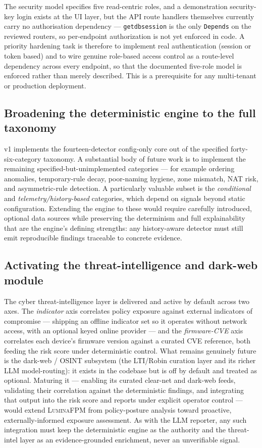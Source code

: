 \documentclass[12pt,a4paper]{report}
\renewcommand{\_}{\textunderscore\allowbreak}
\begin{document}
The security model specifies five read-centric roles, and a demonstration security-key login exists at the UI layer, but the API route handlers themselves currently carry no authorisation dependency --- \texttt{get\_db\_session} is the only \texttt{Depends} on the reviewed routers, so per-endpoint authorization is not yet enforced in code. A priority hardening task is therefore to implement real authentication (session or token based) and to wire genuine role-based access control as a route-level dependency across every endpoint, so that the documented five-role model is enforced rather than merely described. This is a prerequisite for any multi-tenant or production deployment.

\subsection{Broadening the deterministic engine to the full taxonomy}
\label{sec:ch5-taxonomy}

v1 implements the fourteen-detector config-only core out of the specified forty-six-category taxonomy. A substantial body of future work is to implement the remaining specified-but-unimplemented categories --- for example ordering anomalies, temporary-rule decay, poor-naming hygiene, zone mismatch, NAT risk, and asymmetric-rule detection. A particularly valuable subset is the \emph{conditional} and \emph{telemetry/history-based} categories, which depend on signals beyond static configuration. Extending the engine to these would require carefully introduced, optional data sources while preserving the determinism and full explainability that are the engine's defining strengths: any history-aware detector must still emit reproducible findings traceable to concrete evidence.

\subsection{Activating the threat-intelligence and dark-web module}
\label{sec:ch5-lti}

The cyber threat-intelligence layer is delivered and active by default across two axes. The \emph{indicator} axis correlates policy exposure against external indicators of compromise --- shipping an offline indicator set so it operates without network access, with an optional keyed online provider --- and the \emph{firmware-CVE} axis correlates each device's firmware version against a curated CVE reference, both feeding the risk score under deterministic control. What remains genuinely future is the dark-web / OSINT subsystem (the LTI/Robin curation layer and its richer LLM model-routing): it exists in the codebase but is off by default and treated as optional. Maturing it --- enabling its curated clear-net and dark-web feeds, validating their correlation against the deterministic findings, and integrating that output into the risk score and reports under explicit operator control --- would extend \textsc{LuminaFPM} from policy-posture analysis toward proactive, externally-informed exposure assessment. As with the LLM reporter, any such integration must keep the deterministic engine as the authority and the threat-intel layer as an evidence-grounded enrichment, never an unverifiable signal.
\end{document}
